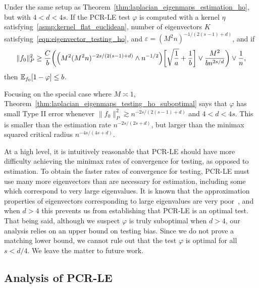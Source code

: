 \begin{theorem}
	\label{thm:laplacian_eigenmaps_testing_ho_suboptimal}
	Under the same setup as Theorem~\ref{thm:laplacian_eigenmaps_estimation_ho}, but with $4 < d < 4s$. If the PCR-LE test $\varphi$ is computed with a kernel $\eta$ satisfying~\ref{asmp:kernel_flat_euclidean}, number of eigenvectors $K$ satisfying~\eqref{eqn:eigenvector_testing_ho}, and $\varepsilon = (M^2n)^{-1/(2(s - 1) + d)}$, and if 
	\begin{equation}
	\label{eqn:laplacian_eigenmaps_testing_criticalradius_ho_suboptimal}
	\|f_0\|_P^2 \geq \frac{C}{b}\biggl(\Bigl(M^2(M^2n)^{-2s/(2(s - 1) + d) } \wedge n^{-1/2}\Bigr)\biggl[\sqrt{\frac{1}{a}} + \frac{1}{b}\biggr] \vee \frac{M^2}{b n^{2s/d}} \biggr) \vee \frac{1}{n},
	\end{equation}
	then $\mathbb{E}_{f_0}[1 - \varphi] \leq b$.
\end{theorem}
Focusing on the special case where $M \asymp 1$, Theorem~\ref{thm:laplacian_eigenmaps_testing_ho_suboptimal} says that $\varphi$ has small Type II error whenever $\|f_0\|_P^2 \gtrsim n^{-2s/(2(s - 1) + d)}$ and $4 < d < 4s$. This is smaller than the estimation rate $n^{-2s/(2s + d)}$, but larger than the minimax squared critical radius $n^{-4s/(4s + d)}$. 

At a high level, it is intuitively reasonable that PCR-LE should have more difficulty achieving the minimax rates of convergence for testing, as opposed to estimation. To obtain the faster rates of convergence for testing, PCR-LE must use many more eigenvectors than are necessary for estimation, including some which correspond to very large eigenvalues. It is known that the approximation properties of eigenvectors corresponding to large eigenvalues are very poor~\citep{burago2014,trillos2019}, and when $d > 4$ this prevents us from establishing that PCR-LE is an optimal test. That being said, although we suspect $\varphi$ is truly suboptimal when $d > 4$, our analysis relies on an upper bound on testing bias. Since we do not prove a matching lower bound, we cannot rule out that the test $\varphi$ is optimal for all $s < d/4$. We leave the matter to future work.

\subsection{Analysis of PCR-LE}
\label{subsec:analysis}

